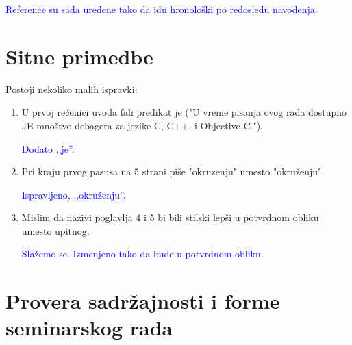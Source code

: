 \documentclass[a4paper]{report}
\newcommand{\odgovor}[1]{\textcolor{blue}{#1}}
\begin{document}
\odgovor{Reference su sada uređene tako da idu hronološki po redosledu navođenja.}

\section{Sitne primedbe}
Postoji nekoliko malih ispravki:
\begin{enumerate}
\item  U prvoj rečenici uvoda fali predikat je ("U vreme pisanja ovog rada dostupno JE mnoštvo debagera za jezike C,
  C++, i Objective-C.").

  \odgovor{Dodato ,,je''.}
\item Pri kraju prvog pasusa na 5 strani piše "okruzenju" umesto "okruženju".

  \odgovor{Ispravljeno, ,,okruženju''.}
  
\item Mislim da nazivi poglavlja 4 i 5 bi bili stilski lepši u potvrdnom obliku umesto upitnog. 
 
\odgovor{Slažemo se. Izmenjeno tako da bude u potvrdnom obliku.}
\end{enumerate}

\section{Provera sadržajnosti i forme seminarskog rada}
\end{document}
